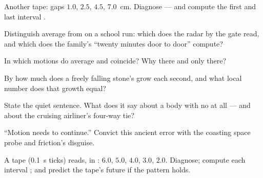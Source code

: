 \begin{exercise}[$\star$]\label{exo:g9:uniform-varied-motion:3}
Another tape: gaps $1.0$, $2.5$, $4.5$, \qty{7.0}{cm}.
Diagnose --- and compute the first and last interval
.
\end{exercise}

\begin{exercise}[$\star$]\label{exo:g9:uniform-varied-motion:4}
Distinguish average from  on a school
run: which does the radar by the gate read, and which does
the family's ``twenty minutes door to door'' compute?
\end{exercise}

\begin{exercise}[$\star$]\label{exo:g9:uniform-varied-motion:5}
In which motions do average and 
coincide? Why there and only there?
\end{exercise}

\begin{exercise}[$\star$]\label{exo:g9:uniform-varied-motion:6}
By how much does a freely falling stone's  grow each
second, and what local number does that growth equal?
\end{exercise}

\begin{exercise}[$\star$]\label{exo:g9:uniform-varied-motion:7}
State the quiet sentence. What does it say about a body
with no  at all --- and about the cruising airliner's
four-way tie?
\end{exercise}

\begin{exercise}[$\star$]\label{exo:g9:uniform-varied-motion:8}
``Motion needs  to continue.'' Convict this ancient
error with the coasting space probe and friction's
disguise.
\end{exercise}

\begin{exercise}[$\star\star$]\label{exo:g9:uniform-varied-motion:9}
A tape (\qty{0.1}{s} ticks) reads, in : $6.0$,
$5.0$, $4.0$, $3.0$, $2.0$. Diagnose; compute each interval
; and predict the tape's future if the pattern holds.
\end{exercise}

